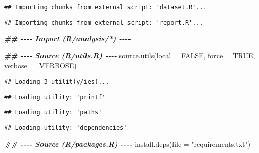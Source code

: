 \documentclass[
  11pt,
  a4paper,
]{scrartcl}
\newenvironment{Shaded}{\begin{snugshade}}{\end{snugshade}}
\newcommand{\AttributeTok}[1]{\textcolor[rgb]{0.77,0.63,0.00}{#1}}
\newcommand{\ConstantTok}[1]{\textcolor[rgb]{0.00,0.00,0.00}{#1}}
\newcommand{\DocumentationTok}[1]{\textcolor[rgb]{0.56,0.35,0.01}{\textbf{\textit{#1}}}}
\newcommand{\FunctionTok}[1]{\textcolor[rgb]{0.00,0.00,0.00}{#1}}
\newcommand{\NormalTok}[1]{#1}
\newcommand{\SpecialCharTok}[1]{\textcolor[rgb]{0.00,0.00,0.00}{#1}}
\newcommand{\StringTok}[1]{\textcolor[rgb]{0.31,0.60,0.02}{#1}}
\begin{document}
\begin{verbatim}
## Importing chunks from external script: 'dataset.R'...
\end{verbatim}

\begin{Shaded}
\end{Shaded}

\begin{verbatim}
## Importing chunks from external script: 'report.R'...
\end{verbatim}

\begin{Shaded}
\begin{Highlighting}[]

\DocumentationTok{\#\# {-}{-}{-}{-} Import (R/analysis/*) {-}{-}{-}{-}}
\end{Highlighting}
\end{Shaded}

\begin{Shaded}
\begin{Highlighting}[]

\DocumentationTok{\#\# {-}{-}{-}{-} Source (R/utils.R) {-}{-}{-}{-}}
\FunctionTok{source.utils}\NormalTok{(}\AttributeTok{local =} \ConstantTok{FALSE}\NormalTok{, }\AttributeTok{force =} \ConstantTok{TRUE}\NormalTok{, }\AttributeTok{verbose =}\NormalTok{ .VERBOSE)}
\end{Highlighting}
\end{Shaded}

\begin{verbatim}
## Loading 3 utilit(y/ies)...
\end{verbatim}

\begin{verbatim}
## Loading utility: 'printf'
\end{verbatim}

\begin{verbatim}
## Loading utility: 'paths'
\end{verbatim}

\begin{verbatim}
## Loading utility: 'dependencies'
\end{verbatim}

\begin{Shaded}
\begin{Highlighting}[]

\DocumentationTok{\#\# {-}{-}{-}{-} Source (R/packages.R) {-}{-}{-}{-}}
\FunctionTok{install.deps}\NormalTok{(}\AttributeTok{file =} \StringTok{"requirements.txt"}\NormalTok{)}
\end{Highlighting}
\end{Shaded}
\end{document}
